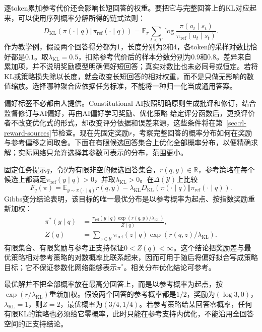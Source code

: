 逐token累加参考代价还会影响长短回答的权重。要把它与完整回答上的KL对应起来，可以使用序列概率分解所得的链式法则：
\[
  D_{\mathrm{KL}}(\pi(\cdot\mid q)\Vert\pi_{\mathrm{ref}}(\cdot\mid q))
  =\mathbb E_\pi\sum_{t<T}
    \log\frac{\pi(a_t\mid s_t)}{\pi_{\mathrm{ref}}(a_t\mid s_t)}.
\]
作为教学例，假设两个回答得分都为1，长度分别为2和4，各token的采样对数比恰好都是$0.1$。取$\lambda_{\mathrm{KL}}=0.5$，扣除参考代价后的样本分数分别为$0.9$和$0.8$。差异来自累加项，并不说明奖励模型明确偏好短回答；真实对数比也未必同号或恒定。若将KL或策略损失除以长度，就会改变长短回答的相对权重，而不是只做无影响的数值缩放。选择哪种聚合应依据任务标准，不能将一种归一化当成通用答案。

偏好标签不必都由人提供。Constitutional AI按照明确原则生成批评和修订，结合监督修订与AI偏好，再由AI偏好学习奖励、优化策略
给定评分函数后，更换评价者不改变优化式的形式，却改变评分依据和误差来源，这些条件将在第~\ref{sec:rl-reward-sources}节检查。现在先固定奖励$r$，考察完整回答的概率分布如何在奖励与参考偏移之间取舍。下面在有限候选回答集合上优化全部概率分布，以便精确求解；实际网络只允许选择其参数可表示的分布，范围更小。

固定任务提示$q$，令$\mathcal Y$为有限非空的候选回答集合，$r(q,y)\in\mathbb R$，参考策略在每个候选上都满足$\pi_{\mathrm{ref}}(y\mid q)>0$，并取$\lambda_{\mathrm{KL}}>0$。在$\Delta(\mathcal Y)$上比较
\[
  F_q(\pi)=\mathbb E_{y\sim\pi(\cdot\mid q)}r(q,y)
   -\lambda_{\mathrm{KL}}D_{\mathrm{KL}}(\pi(\cdot\mid q)\Vert
                                    \pi_{\mathrm{ref}}(\cdot\mid q)).
\]
Gibbs变分结论表明，该目标的唯一最优分布是以参考概率为起点、按指数奖励重新加权：
\begin{equation}
  \begin{aligned}
    \pi^*(y\mid q)&=
      \frac{\pi_{\mathrm{ref}}(y\mid q)\exp(r(q,y)/\lambda_{\mathrm{KL}})}{Z(q)},\\
    Z(q)&=\sum_{z\in\mathcal Y}\pi_{\mathrm{ref}}(z\mid q)
                              \exp(r(q,z)/\lambda_{\mathrm{KL}}).
  \end{aligned}
  \label{eq:rl-reward-kl-optimum}
\end{equation}
有限集合、有限奖励与参考正支持保证$0<Z(q)<\infty$。这个结论把奖励差与最优策略相对参考策略的对数概率比联系起来，因而可用于随后将偏好拟合写成策略目标；它不保证参数化网络能够表示$\pi^*$。相关分布优化结论可参考。

最优解并不把全部概率放在最高分回答上，而是以参考概率为起点，按$\exp(r/\lambda_{\mathrm{KL}})$重新加权。假设两个回答的参考概率都是$1/2$，奖励为$(\log3,0)$，$\lambda_{\mathrm{KL}}=1$，则$Z=2$，最优概率为$(3/4,1/4)$。若参考策略给某回答零概率，任何有限KL的策略也必须给它零概率，此时只能在参考支持内优化，不能沿用全回答空间的正支持结论。

